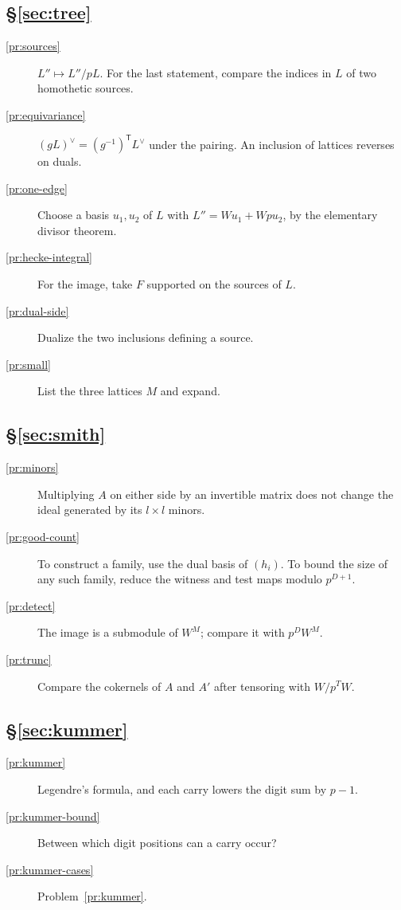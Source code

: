 \documentclass[reqno]{amsart}
\theoremstyle{definition}
\theoremstyle{plain}
\begin{document}
\subsection*{\S\ref{sec:tree}}
\begin{description}
\item[\ref{pr:sources}] \(L'' \mapsto L''/pL\).  For the last statement, compare the indices in \(L\) of two homothetic sources.
\item[\ref{pr:equivariance}] \((gL)^\vee = (g^{-1})^{\mathsf T} L^\vee\) under the pairing.  An inclusion of lattices reverses on duals.
\item[\ref{pr:one-edge}] Choose a basis \(u_1, u_2\) of \(L\) with \(L'' = Wu_1 + Wpu_2\), by the elementary divisor theorem.
\item[\ref{pr:hecke-integral}] For the image, take \(F\) supported on the sources of \(L\).
\item[\ref{pr:dual-side}] Dualize the two inclusions defining a source.
\item[\ref{pr:small}] List the three lattices \(M\) and expand.
\end{description}

\subsection*{\S\ref{sec:smith}}
\begin{description}
\item[\ref{pr:minors}] Multiplying \(A\) on either side by an invertible matrix does not change the ideal generated by its \(l \times l\) minors.
\item[\ref{pr:good-count}] To construct a family, use the dual basis of \((h_i)\).  To bound the size of any such family, reduce the witness and test maps modulo \(p^{D+1}\).
\item[\ref{pr:detect}] The image is a submodule of \(W^M\); compare it with \(p^D W^M\).
\item[\ref{pr:trunc}] Compare the cokernels of \(A\) and \(A'\) after tensoring with \(W/p^T W\).
\end{description}

\subsection*{\S\ref{sec:kummer}}
\begin{description}
\item[\ref{pr:kummer}] Legendre's formula, and each carry lowers the digit sum by \(p - 1\).
\item[\ref{pr:kummer-bound}] Between which digit positions can a carry occur?
\item[\ref{pr:kummer-cases}] Problem~\ref{pr:kummer}.
\end{description}
\end{document}
